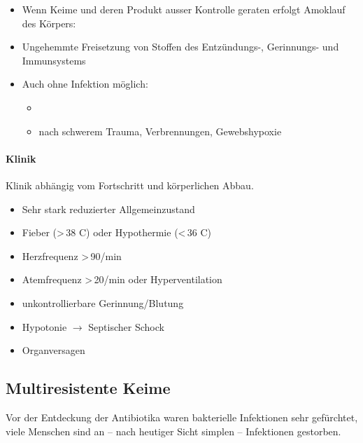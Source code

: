 \begin{itemize}
\item Wenn Keime und deren Produkt ausser Kontrolle geraten erfolgt
Amoklauf des K\"orpers:

\item Ungehemmte Freisetzung von Stoffen des Entz\"undungs-, Gerinnungs-
und Immunsystems

\item Auch ohne Infektion m\"oglich:


\begin{itemize}
\item {} 
\item nach schwerem Trauma, Verbrennungen, Gewebshypoxie
\end{itemize}\end{itemize}


\paragraph{Klinik} Klinik abh\"angig vom Fortschritt und
k\"orperlichen Abbau.


\begin{itemize}
\item Sehr stark reduzierter Allgemeinzustand

\item Fieber ({\textgreater}\,38{\textdegree} C) oder
Hypothermie ({\textless}\,36{\textdegree} C)

\item Herzfrequenz {\textgreater}\,90/min

\item Atemfrequenz {\textgreater}\,20/min oder
Hyperventilation

\item unkontrollierbare Gerinnung/Blutung

\item Hypotonie ${\rightarrow}$ Septischer Schock

\item Organversagen  

\end{itemize}

\subsection{Multiresistente Keime}

Vor der Entdeckung der Antibiotika waren bakterielle Infektionen sehr
gef\"urchtet, viele Menschen sind an -- nach heutiger Sicht simplen --
Infektionen gestorben. 

